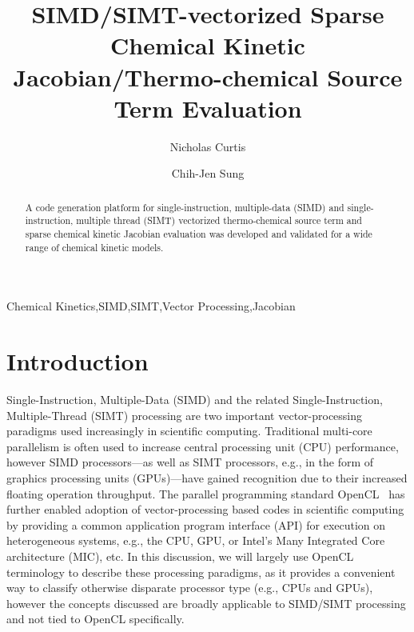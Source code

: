 \documentclass[12pt,number,sort&compress,preprint]{elsarticle}
\title{SIMD\slash SIMT-vectorized Sparse Chemical Kinetic Jacobian\slash Thermo-chemical Source Term Evaluation}
\author[1]{Nicholas Curtis\corref{corr}}
\author[1]{Chih-Jen Sung}
\begin{document}
\begin{frontmatter}

\begin{abstract} %
A code generation platform for single-instruction, multiple-data (SIMD) and single-instruction, multiple thread (SIMT) vectorized thermo-chemical source term and sparse chemical kinetic Jacobian evaluation was developed and validated for a wide range of chemical kinetic models.
\end{abstract}

\begin{keyword}
    Chemical Kinetics\sep SIMD\sep SIMT\sep Vector Processing\sep Jacobian
\end{keyword}

\end{frontmatter}

\section{Introduction}
%

Single-Instruction, Multiple-Data (SIMD) and the related Single-Instruction, Multiple-Thread (SIMT) processing are two important vector-processing paradigms used increasingly in scientific computing.
Traditional multi-core parallelism is often used to increase central processing unit (CPU) performance, however SIMD processors---as well as SIMT processors, e.g., in the form of graphics processing units (GPUs)---have gained recognition due to their increased floating operation throughput.
The parallel programming standard OpenCL~\cite{stone2010opencl} has further enabled adoption of vector-processing based codes in scientific computing by providing a common application program interface (API) for execution on heterogeneous systems, e.g., the CPU, GPU, or Intel's Many Integrated Core architecture (MIC), etc.
In this discussion, we will largely use OpenCL terminology to describe these processing paradigms, as it provides a convenient way to classify otherwise disparate processor type (e.g., CPUs and GPUs), however the concepts discussed are broadly applicable to SIMD\slash SIMT processing and not tied to OpenCL specifically.
\end{document}
